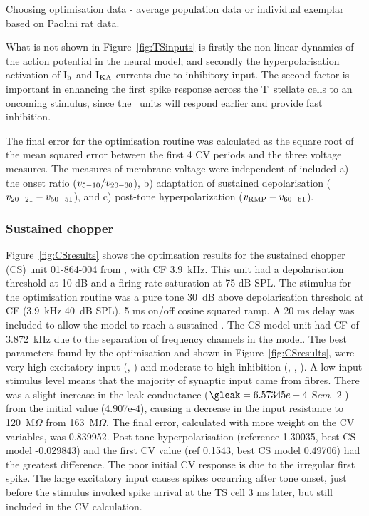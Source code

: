 Choosing optimisation data - average population data or individual exemplar
based on Paolini rat data.


What is not shown in Figure~\ref{fig:TSinputs} is firstly the non-linear dynamics of the action potential in the neural model; and secondly the hyperpolarisation activation of I$_{\rm h}$ and I$_{\rm KA}$ currents due to inhibitory input.
The second factor is important in enhancing the first spike response across the T~stellate cells \citep{PaoliniClareyEtAl:2004} to an oncoming stimulus, since the \OnC~units will respond earlier and provide fast inhibition.


The final error for the optimisation routine was calculated as the square root of the mean squared error between the first 4 CV periods and the three voltage measures. 
The measures of membrane voltage were independent of \RMP included a) the onset ratio ($v_{\rm 5-10}/v_{\rm 20-30}$), b) adaptation of sustained depolarisation ($v_{\rm 20-21} - v_{\rm 50-51}$), and c) post-tone hyperpolarization ($v_{\rm RMP} - v_{\rm 60-61}$).
 

\subsubsection{Sustained chopper}

Figure~\ref{fig:CSresults} shows the optimsation results for the sustained chopper (CS) unit 01-864-004 from \citep{PaoliniClareyEtAl:2005}, with CF 3.9~kHz.
This unit had a depolarisation threshold at 10 dB and a firing rate saturation at 75 dB SPL.  
The stimulus for the optimisation routine was a pure tone 30~dB above depolarisation threshold at CF (3.9~kHz 40~dB SPL), 5 ms on/off cosine squared ramp.
A 20 ms delay was included to allow the model to reach a sustained \RMP. The CS model unit had CF of 3.872~kHz due to the separation of frequency channels in the model.
The best parameters found by the optimisation and shown in Figure~\ref{fig:CSresults}, were very high excitatory input (, ) and moderate to high inhibition (, , ).
A low input stimulus level means that the majority of synaptic input came from \HSR fibres.
There was a slight increase in the leak conductance ($\gleak=6.57345e-4$ S$cm^-2$ ) from the initial value (4.907e-4), causing a decrease in the input resistance to 120~M$\Omega$ from 163~M$\Omega$.  
The final error, calculated with more weight on the CV variables, was 0.839952.
Post-tone hyperpolarisation (reference 1.30035, best CS model -0.029843) and the first CV value (ref 0.1543, best CS model 0.49706) had the greatest difference.  
The poor initial CV response is due to the irregular first spike.   
The large excitatory \HSR input causes spikes occurring after tone onset, just before the stimulus invoked spike arrival at the TS cell 3 ms later, but still included in the CV calculation.


